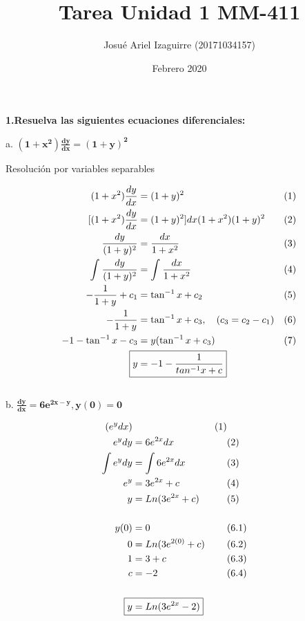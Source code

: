 \documentclass{article}
\title{Tarea Unidad 1 MM-411}
\author{Josué Ariel Izaguirre (20171034157)}
\date{Febrero 2020}
\begin{document}
    \maketitle
    \begin{flushleft}
        \textbf{1.Resuelva las siguientes ecuaciones diferenciales:} \break
        
        
        \hspace{10mm} a. $
            \boldsymbol{\left( 1+x^2 \right) \frac{dy}{dx} = \left(1+y \right)^2}
            $  \break

            \hspace{10mm} Resolución por variables separables \break

                \begin{align*}
                    ( 1+x^2 ) \frac{dy}{dx} & = (1+y )^2  &&\text{(1)}\\
                    [ ( 1+x^2 ) \frac{dy}{dx} & = (1+y)^2 ] {dx}{(1+x^2)(1+y)^2} &&\text{(2)}\\
                    \frac{dy}{(1+y)^2} & = \frac{dx}{1+x^2} &&\text{(3)}\\
                    \int_{}^{} \frac{dy}{(1+y)^2} & = \int_{}^{} \frac{dx}{1+x^2} &&\text{(4)}\\
                    -\frac{1}{1+y} + c_1 & = \tan ^ {-1} {x} + c_2 &&\text{(5)}\\
                    -\frac{1}{1+y} & = \tan ^ {-1} {x} + c_3, \quad (c_3 = c_2 - c_1) &&\text{(6)} \\
                    -1 - \tan ^ {-1} {x} - c_3 & = y ( \tan ^ {-1} {x} + c_{3} ) &&\text{(7)} \\
                    \Aboxed{y & = -1 - \frac{1}{tan ^{-1}x + c}}
                \end{align*}\\

        \hspace{10mm} b. $
            \boldsymbol{\frac{dy}{dx} = 6e^{2x-y} , y(0) = 0}
            $  \break

            \begin{align*}
                [ \frac{dy}{dx} & = 6\frac{e^{2x}}{e^y} ] (e^y dx) && \text{(1)} \\
                e^y dy & = 6e^{2x} dx && \text{(2)} \\
                \int e^y dy & = \int 6e^{2x} dx && \text{(3)} \\
                e^y & = 3e^{2x} + c && \text{(4)} \\
                y & = Ln(3e^{2x} + c) && \text{(5)} \\
                \\
                y(0) & = 0 && \text{(6.1)} \\
                0 & = Ln(3e^{2(0)} + c) && \text{(6.2)} \\
                1 & = 3 + c && \text{(6.3)} \\
                c & = -2 && \text{(6.4)}\\
                \\
                \Aboxed{y &= Ln(3e^{2x}-2)}
            \end{align*}


\end{flushleft}
\end{document}
